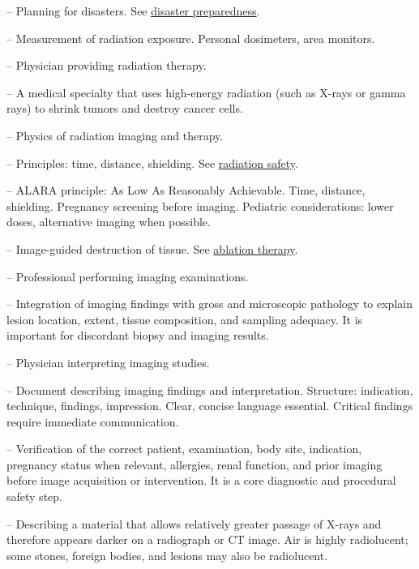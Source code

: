 -- Planning for disasters. See \hyperlink{Disaster Preparedness}{disaster preparedness}.

-- Measurement of radiation exposure. Personal dosimeters, area monitors.

-- Physician providing radiation therapy.

-- A medical specialty that uses high-energy radiation (such as X-rays or gamma rays) to shrink tumors and destroy cancer cells.

-- Physics of radiation imaging and therapy.

-- Principles: time, distance, shielding. See \hyperlink{Radiation Safety}{radiation safety}.

-- ALARA principle: As Low As Reasonably Achievable. Time, distance, shielding. Pregnancy screening before imaging. Pediatric considerations: lower doses, alternative imaging when possible.

-- Image-guided destruction of tissue. See \hyperlink{Ablation Therapy}{ablation therapy}.

-- Professional performing imaging examinations.

-- Integration of imaging findings with gross and microscopic pathology to explain lesion location, extent, tissue composition, and sampling adequacy. It is important for discordant biopsy and imaging results.

-- Physician interpreting imaging studies.

-- Document describing imaging findings and interpretation. Structure: indication, technique, findings, impression. Clear, concise language essential. Critical findings require immediate communication.

-- Verification of the correct patient, examination, body site, indication, pregnancy status when relevant, allergies, renal function, and prior imaging before image acquisition or intervention. It is a core diagnostic and procedural safety step.

-- Describing a material that allows relatively greater passage of X-rays and therefore appears darker on a radiograph or CT image. Air is highly radiolucent; some stones, foreign bodies, and lesions may also be radiolucent.

